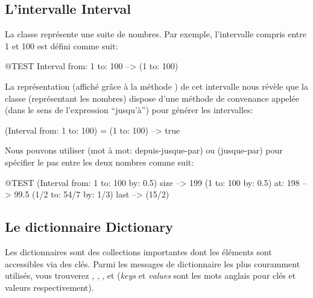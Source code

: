\documentclass[a4paper,10pt,twoside]{book}
\begin{document}



\subsection{L'intervalle Interval}
La classe  représente une suite de nombres.
Par exemple, l'intervalle compris entre 1 et 100 est défini comme suit:
\begin{code}{@TEST}
Interval from: 1 to: 100 --> (1 to: 100)
\end{code}

\noindent
La représentation (affiché grâce à la méthode ) de cet intervalle nous révèle que la classe  (représentant les nombres) dispose d'une méthode de convenance appelée  (dans le sens de l'expression ``jusqu'à'') pour générer les intervalles:

\begin{code}{}
(Interval from: 1 to: 100) = (1 to: 100) --> true
\end{code}

Nous pouvons utiliser  (mot à mot: depuis-jusque-par) ou
 (jusque-par) pour spécifier le pas entre les deux nombres comme suit:

\begin{code}{@TEST}
(Interval from: 1 to: 100 by: 0.5) size --> 199
(1 to: 100 by: 0.5) at: 198 --> 99.5
(1/2 to: 54/7 by: 1/3) last --> (15/2)
\end{code}

\subsection{Le dictionnaire Dictionary}
Les dictionnaires sont des collections importantes dont les éléments
sont accessibles via des clés.
Parmi les messages de dictionnaire les plus couramment utilisés, vous trouverez  
, , ,  et  (\emph{keys} et \emph{values} sont les mots anglais pour clés et valeurs respectivement).
\end{document}

